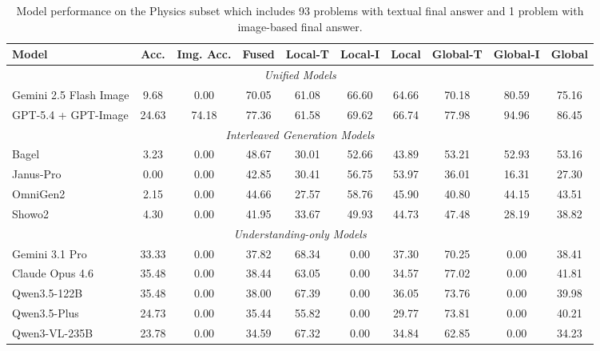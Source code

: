 \documentclass[11pt]{article}
\begin{document}
\begin{table}[t]
  \centering
  \small
  \begin{tabular}{lccccccccc}
    \toprule
    Model & Acc. & Img. Acc. & Fused & Local-T & Local-I & Local & Global-T & Global-I & Global \\
    \midrule
    \multicolumn{10}{c}{\textit{Unified Models}} \\
    \midrule
    Gemini 2.5 Flash Image & 9.68 & 0.00 & 70.05 & 61.08 & 66.60 & 64.66 & 70.18 & 80.59 & 75.16 \\
    GPT-5.4 + GPT-Image & 24.63 & 74.18 & 77.36 & 61.58 & 69.62 & 66.74 & 77.98 & 94.96 & 86.45 \\
    \midrule
    \multicolumn{10}{c}{\textit{Interleaved Generation Models}} \\
    \midrule
    Bagel & 3.23 & 0.00 & 48.67 & 30.01 & 52.66 & 43.89 & 53.21 & 52.93 & 53.16 \\
    Janus-Pro & 0.00 & 0.00 & 42.85 & 30.41 & 56.75 & 53.97 & 36.01 & 16.31 & 27.30 \\
    OmniGen2 & 2.15 & 0.00 & 44.66 & 27.57 & 58.76 & 45.90 & 40.80 & 44.15 & 43.51 \\
    Showo2 & 4.30 & 0.00 & 41.95 & 33.67 & 49.93 & 44.73 & 47.48 & 28.19 & 38.82 \\
    \midrule
    \multicolumn{10}{c}{\textit{Understanding-only Models}} \\
    \midrule
    Gemini 3.1 Pro & 33.33 & 0.00 & 37.82 & 68.34 & 0.00 & 37.30 & 70.25 & 0.00 & 38.41 \\
    Claude Opus 4.6 & 35.48 & 0.00 & 38.44 & 63.05 & 0.00 & 34.57 & 77.02 & 0.00 & 41.81 \\
    Qwen3.5-122B & 35.48 & 0.00 & 38.00 & 67.39 & 0.00 & 36.05 & 73.76 & 0.00 & 39.98 \\
    Qwen3.5-Plus & 24.73 & 0.00 & 35.44 & 55.82 & 0.00 & 29.77 & 73.81 & 0.00 & 40.21 \\
    Qwen3-VL-235B & 23.78 & 0.00 & 34.59 & 67.32 & 0.00 & 34.84 & 62.85 & 0.00 & 34.23 \\
    \bottomrule
  \end{tabular}
  \caption{Model performance on the Physics subset which includes 93 problems with textual final answer and 1 problem with image-based final answer.}
  \label{tab:domain_phy_metrics}
\end{table}
\end{document}
